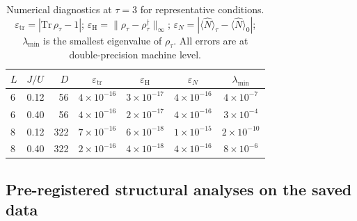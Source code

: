\documentclass[aps,prresearch,reprint,amsmath,amssymb,longbibliography,floatfix]{revtex4-2}
\begin{document}
\begin{table}[tbp]
\centering
\caption{Numerical diagnostics at $\tau=3$ for representative conditions.
$\varepsilon_{\mathrm{tr}}=|\mathrm{Tr}\,\rho_\tau-1|$;
$\varepsilon_{\mathrm{H}}=\|\rho_\tau-\rho_\tau^\dagger\|_\infty$;
$\varepsilon_{N}=|\langle\hat{N}\rangle_\tau-\langle\hat{N}\rangle_0|$;
$\lambda_{\min}$ is the smallest eigenvalue of $\rho_\tau$.
All errors are at double-precision machine level.}
\label{tab:diagnostics}
\begin{ruledtabular}
\begin{tabular}{llrcccc}
$L$ & $J/U$ & $D$ & $\varepsilon_{\mathrm{tr}}$ & $\varepsilon_{\mathrm{H}}$ & $\varepsilon_{N}$ & $\lambda_{\min}$ \\
\hline
6 & 0.12 & 56  & $4\times10^{-16}$ & $3\times10^{-17}$ & $4\times10^{-16}$ & $4\times10^{-7}$  \\
6 & 0.40 & 56  & $4\times10^{-16}$ & $2\times10^{-17}$ & $4\times10^{-16}$ & $3\times10^{-4}$  \\
8 & 0.12 & 322 & $7\times10^{-16}$ & $6\times10^{-18}$ & $1\times10^{-15}$ & $2\times10^{-10}$ \\
8 & 0.40 & 322 & $2\times10^{-16}$ & $4\times10^{-18}$ & $4\times10^{-16}$ & $8\times10^{-6}$  \\
\end{tabular}
\end{ruledtabular}
\end{table}

\subsection{Pre-registered structural analyses on the saved data}
\label{sec:reanalysis_methods}
\end{document}
